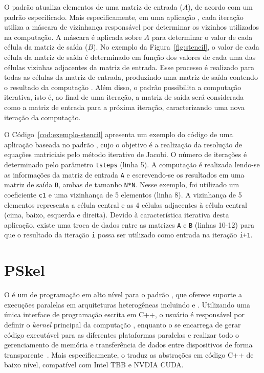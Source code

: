 O padrão \stencil atualiza elementos de uma matriz de entrada ($A$),
de acordo com um padrão especificado. Mais especificamente, em uma aplicação
\stencil, cada iteração utiliza a máscara de vizinhança responsável por determinar os vizinhos
utilizados na computação. A máscara é aplicada sobre $A$ para determinar o valor de cada
célula da matriz de saída ($B$). No exemplo da Figura~\ref{fig:stencil}, o
valor de cada célula da matriz de saída é determinado em função dos
valores de cada uma das células vizinhas adjacentes da matriz de entrada. Esse processo é realizado
para todas as células da matriz de entrada, produzindo uma matriz de saída contendo o resultado da computação \stencil. Além disso, o padrão possibilita a computação
iterativa, isto é, ao final de uma iteração, a matriz de saída será
considerada como a matriz de entrada para a próxima iteração,
caracterizando uma nova iteração da computação.

O Código~\ref{cod:exemplo-stencil} apresenta um exemplo do código de uma aplicação baseada no padrão
\stencil, cujo o objetivo é a realização da resolução de equações matriciais pelo método iterativo de Jacobi.
O número de iterações é determinado pelo parâmetro \texttt{tsteps} (linha 5). A computação
\stencil é realizada lendo-se as informações da matriz de entrada \texttt{A} e escrevendo-se os resultados em uma matriz de saída \texttt{B}, ambas de tamanho \texttt{N*N}.
Nesse exemplo, foi utilizado um coeficiente \texttt{c1} e uma vizinhança de 5 elementos (linha 8). A vizinhança de 5 elementos
representa a célula central e as 4 células adjacentes à célula central (cima, baixo, esquerda e direita).
Devido à característica iterativa desta aplicação, existe uma troca de dados entre as matrizes \texttt{A} e \texttt{B}
(linhas 10-12) para que o resultado da iteração \texttt{i} possa ser utilizado como entrada na iteração
\texttt{i+1}.


\section{PSkel}
\label{sec:pskel}

O \pskel é um \fw de programação em alto nível para o padrão \stencil, que
oferece suporte a execuções paralelas em arquiteturas heterogêneas incluindo \cpu
e \gpu. Utilizando uma única interface de programação escrita em C++, o usuário é
responsável por definir o \textit{kernel} principal da computação \stencil,
enquanto o \fw se encarrega de gerar código executável para as diferentes
plataformas paralelas e realizar todo o gerenciamento de memória e transferência
de dados entre dispositivos de forma transparente~\cite{pereira15}. Mais
especificamente, o \pskel traduz as abstrações em código C++ de baixo nível,
compatível com Intel TBB e NVDIA CUDA.

